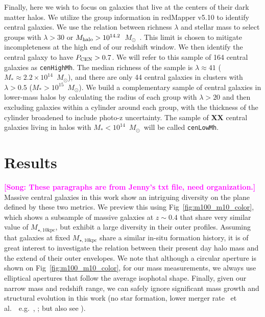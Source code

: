\documentclass[a4paper,fleqn,usenatbib]{mnras}
\def\msun{$M_\odot$}
\def\etal{{\ et al.~}}
\def\rbcg{\texttt{cenHighMh}}
\def\nbcg{\texttt{cenLowMh}}
\def\minn{{$M_{\star,10\mathrm{kpc}}$}}
\newcommand{\song}[1]{\textcolor{magenta}{\textbf{[Song: #1]}}}
\begin{document}
    Finally, here we wish to focus on galaxies that live at the centers of their dark matter halos. 
    We utilize the group information 
    in redMapper v5.10 \citep{Rykoff2014,Rozo2015b} to identify central galaxies. We use the 
    relation between richness $\lambda$ and stellar mass to select groups with 
    $\lambda>30$ or $M_{\rm halo}>10^{14.2}$~\msun\ \citep[e.g.,][]{simetetal2016}. This limit is chosen 
    to mitigate incompleteness at the high end of our redshift window. We then identify the 
    central galaxy to have $P_{\rm CEN}>0.7$. We will refer to this sample of 164 central galaxies as \rbcg{}. The median 
    richness of the sample is $\lambda \approx 41$ ($M_* \approx 2.2 \times 10^{14}$~\msun), and there are 
    only 44 central galaxies in clusters with $\lambda>0.5$ ($M_* > 10^{15}$~\msun). We build a complementary 
    sample of central galaxies in lower-mass halos by calculating the radius of each group with 
    $\lambda>20$ \citep{Diemer2015} and 
    then excluding galaxies within a cylinder around each group, with the thickness of the cylinder broadened to include 
    photo-z uncertainty. The sample of {\bf XX} central galaxies living in halos with $M_* < 10^{14}$~\msun\ will 
    be called \nbcg{}.



    

\section{Results}
    \label{sec:result}

    


    \song{These paragraphs are from Jenny's txt file, need organization.}
    Massive central galaxies in this work show an intriguing diversity on the plane 
    defined by these two metrics.  
    We preview this using Fig~\ref{fig:m100_m10_color}, which shows a subsample of 
    massive galaxies at $z{\sim} 0.4$ that share very similar value of \minn{}, but 
    exhibit a large diversity in their outer profiles. 
    Assuming that galaxies at fixed \minn{} share a similar in-situ formation history, 
    it is of great interest to investigate the relation between their present day halo 
    mass and the extend of their outer envelopes. 
    We note that although a circular aperture is shown on Fig~\ref{fig:m100_m10_color}, 
    for our mass measurements, we always use elliptical apertures that follow the 
    average isophotal shape. Finally, given our narrow mass and redshift range, we 
    can safely ignore significant mass growth and structural evolution in this work
    (no star formation, lower merger rate \etal~e.g.\ \citealt{Bellstedt2016},
    \citealt{Inagaki2015}; but also see \citealt{Bai2014}). 
\end{document}
